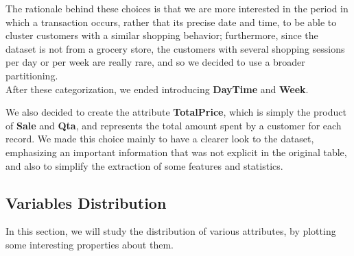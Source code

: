 The rationale behind these choices is that we are more interested in the period in which a transaction occurs, rather that its precise date and time, to be able to cluster customers with a similar shopping behavior; furthermore, since the dataset is not from a grocery store, the customers with several shopping sessions per day or per week are really rare, and so we decided to use a broader partitioning.\\
After these categorization, we ended introducing \textbf{DayTime} and \textbf{Week}.

We also decided to create the attribute \textbf{TotalPrice}, which is simply the product of \textbf{Sale} and \textbf{Qta}, and represents the total amount spent by a customer for each record. We made this choice mainly to have a clearer look to the dataset, emphasizing an important information that was not explicit in the original table, and also to simplify the extraction of some features and statistics.

\subsection{Variables Distribution}
In this section, we will study the distribution of various attributes, by plotting some interesting properties about them.

